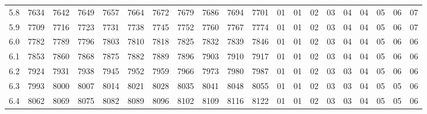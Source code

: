 \documentclass[12pt,UTF8,fontset=none]{ctexbook}
\begin{document}
\begin{appendix}
\begin{longtable}{|c| c c c c c | c c c c c| c c c c c c c c c|}
\scriptsize 5.8 & \scriptsize 7634 & \scriptsize 7642 & \scriptsize 7649 & \scriptsize 7657 & \scriptsize 7664 & \scriptsize 7672 & \scriptsize 7679 & \scriptsize 7686 & \scriptsize 7694 & \scriptsize 7701 & \scriptsize 01 & \scriptsize 01 & \scriptsize 02 & \scriptsize 03 & \scriptsize 04 & \scriptsize 04 & \scriptsize 05 & \scriptsize 06 & \scriptsize 07 \\
\scriptsize 5.9 & \scriptsize 7709 & \scriptsize 7716 & \scriptsize 7723 & \scriptsize 7731 & \scriptsize 7738 & \scriptsize 7745 & \scriptsize 7752 & \scriptsize 7760 & \scriptsize 7767 & \scriptsize 7774 & \scriptsize 01 & \scriptsize 01 & \scriptsize 02 & \scriptsize 03 & \scriptsize 04 & \scriptsize 04 & \scriptsize 05 & \scriptsize 06 & \scriptsize 07 \\
\scriptsize 6.0 & \scriptsize 7782 & \scriptsize 7789 & \scriptsize 7796 & \scriptsize 7803 & \scriptsize 7810 & \scriptsize 7818 & \scriptsize 7825 & \scriptsize 7832 & \scriptsize 7839 & \scriptsize 7846 & \scriptsize 01 & \scriptsize 01 & \scriptsize 02 & \scriptsize 03 & \scriptsize 04 & \scriptsize 04 & \scriptsize 05 & \scriptsize 06 & \scriptsize 06 \\
\scriptsize 6.1 & \scriptsize 7853 & \scriptsize 7860 & \scriptsize 7868 & \scriptsize 7875 & \scriptsize 7882 & \scriptsize 7889 & \scriptsize 7896 & \scriptsize 7903 & \scriptsize 7910 & \scriptsize 7917 & \scriptsize 01 & \scriptsize 01 & \scriptsize 02 & \scriptsize 03 & \scriptsize 04 & \scriptsize 04 & \scriptsize 05 & \scriptsize 06 & \scriptsize 06 \\
\scriptsize 6.2 & \scriptsize 7924 & \scriptsize 7931 & \scriptsize 7938 & \scriptsize 7945 & \scriptsize 7952 & \scriptsize 7959 & \scriptsize 7966 & \scriptsize 7973 & \scriptsize 7980 & \scriptsize 7987 & \scriptsize 01 & \scriptsize 01 & \scriptsize 02 & \scriptsize 03 & \scriptsize 03 & \scriptsize 04 & \scriptsize 05 & \scriptsize 06 & \scriptsize 06 \\
\scriptsize 6.3 & \scriptsize 7993 & \scriptsize 8000 & \scriptsize 8007 & \scriptsize 8014 & \scriptsize 8021 & \scriptsize 8028 & \scriptsize 8035 & \scriptsize 8041 & \scriptsize 8048 & \scriptsize 8055 & \scriptsize 01 & \scriptsize 01 & \scriptsize 02 & \scriptsize 03 & \scriptsize 03 & \scriptsize 04 & \scriptsize 05 & \scriptsize 05 & \scriptsize 06 \\
\scriptsize 6.4 & \scriptsize 8062 & \scriptsize 8069 & \scriptsize 8075 & \scriptsize 8082 & \scriptsize 8089 & \scriptsize 8096 & \scriptsize 8102 & \scriptsize 8109 & \scriptsize 8116 & \scriptsize 8122 & \scriptsize 01 & \scriptsize 01 & \scriptsize 02 & \scriptsize 03 & \scriptsize 03 & \scriptsize 04 & \scriptsize 05 & \scriptsize 05 & \scriptsize 06 \\

\end{longtable}
\end{appendix}
\end{document}
